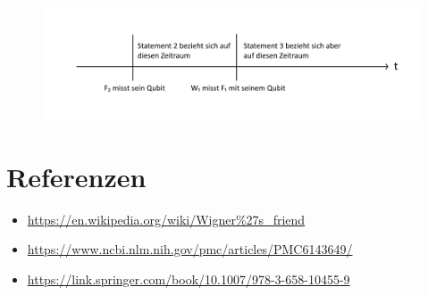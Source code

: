 \documentclass[a4paper]{article}
\begin{document}
\begin{figure}[!htb]
\begin{floatrow}[1]\
%
{\includegraphics[width=1\textwidth]{neu.png}}
\end{floatrow}
\end{figure}

\pagebreak

\section*{Referenzen}
\begin{itemize}
	\item \url{https://en.wikipedia.org/wiki/Wigner%27s_friend}
	\item \url{https://www.ncbi.nlm.nih.gov/pmc/articles/PMC6143649/}
	\item \url{https://link.springer.com/book/10.1007/978-3-658-10455-9}
\end{itemize}
\end{document}
